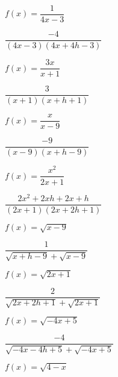 \documentclass{ximera}
\begin{document}
\begin{question}
\begin{problem}
$f(x) = \dfrac{1}{4x-3}$ 

\begin{solution}
    $\dfrac{-4}{(4x-3)(4x+4h-3)}$
\end{solution}
\end{problem} 

\begin{problem}
$f(x) = \dfrac{3x}{x+1}$  

\begin{solution}
    $\dfrac{3}{(x+1)(x+h+1)}$
\end{solution}
\end{problem}  

\begin{problem}
$f(x) = \dfrac{x}{x - 9}$  

\begin{solution}
    $\dfrac{-9}{(x - 9)(x + h - 9)}$
\end{solution}
\end{problem}

\begin{problem}
$f(x) = \dfrac{x^2}{2x+1}$  

\begin{solution}
    $\dfrac{2x^2+2xh+2x+h}{(2x+1)(2x+2h+1)}$
\end{solution}
\end{problem} 

\begin{problem}
$f(x) = \sqrt{x-9}$

\begin{solution}
$\dfrac{1}{\sqrt{x+h-9} + \sqrt{x-9}}$
\end{solution}
\end{problem}   

\begin{problem}
$f(x) = \sqrt{2x+1}$ 

\begin{solution}
    $\dfrac{2}{\sqrt{2x+2h+1} + \sqrt{2x+1}}$
\end{solution}
\end{problem}   

\begin{problem}
$f(x) = \sqrt{-4x+5}$ 

\begin{solution}
    $\dfrac{-4}{\sqrt{-4x-4h+5} + \sqrt{-4x+5}}$
\end{solution}
\end{problem}

\begin{problem}
$f(x) = \sqrt{4-x}$ 


\end{problem}
\end{question}
\end{document}
